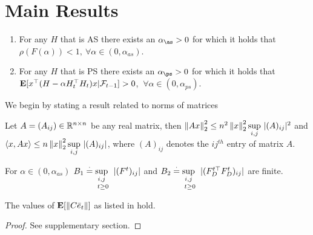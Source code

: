 \section{Main Results}
\begin{lemma}\label{addstep}
\begin{enumerate}[label=(\roman*)]
\item\label{ascase} For any $H$ that is AS there exists an $\alpha_{\as}>0$ for which it holds that $\rho(F(\alpha))<1,~\forall \alpha\in (0,\alpha_{as})$.
\item\label{pscase} For any $H$ that is PS there exists an $\alpha_{\ps}>0$ for which it holds that $\E[x^\top(H-\alpha H_t^\top H_t)x|\F_{t-1}]> 0$, $~\forall \alpha\in (0,\alpha_{ps})$.
\end{enumerate}
\end{lemma}
We begin by stating a result related to norms of matrices
\begin{lemma}
Let $A=(A_{ij})\in \R^{n\times n}$ be any real matrix, then $\norm{Ax}^2_2\leq n^2 \norm{x}^2_2 \us{\sup}{i,j}|(A)_{ij}|^2$ and $\ip{x,Ax}\leq n \norm{x}^2_2\us{\sup}{i,j}|(A)_{ij}|$, where $(A)_{ij}$ denotes the $ij^{th}$ entry of matrix $A$.
\end{lemma}
\begin{lemma}
For $\alpha \in (0,\alpha_{as})$ $B_1\eqdef\us{\us{\sup}{i,j}}{t\geq 0}|(F^t)_{ij}|$ and $B_2\eqdef\us{\us{\sup}{i,j}}{t\geq 0}|(F_D^{t\top}F_D^t)_{ij}|$ are finite.
\end{lemma}
\begin{theorem}\label{maintheorem}
The values of $\E[\norm{C\eb_t}]$ as listed in  hold.
\end{theorem}
\begin{proof}
See supplementary section.
\end{proof}
